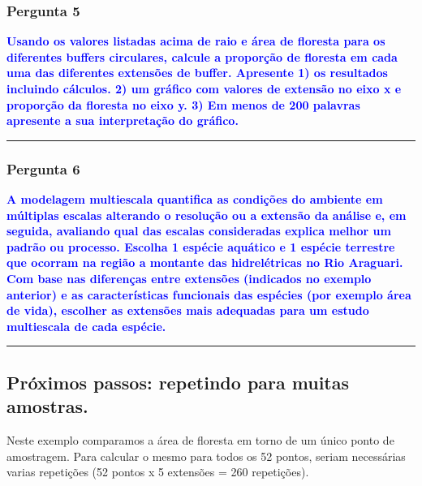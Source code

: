 \documentclass[
]{article}
\begin{document}
\hypertarget{pergunta-5}{%
\subsubsection{Pergunta 5}\label{pergunta-5}}

\textcolor{blue}{\textbf{Usando os valores listadas acima de raio e área de floresta para os diferentes buffers circulares, calcule a proporção de floresta em cada uma das diferentes extensões de buffer. Apresente 1) os resultados incluindo cálculos. 2) um gráfico com valores de extensão no eixo x e proporção da floresta no eixo y. 3) Em menos de 200 palavras apresente a sua interpretação do gráfico.}}

\begin{center}\rule{0.5\linewidth}{0.5pt}\end{center}

\hypertarget{pergunta-6}{%
\subsubsection{Pergunta 6}\label{pergunta-6}}

\textcolor{blue}{\textbf{A modelagem multiescala quantifica as condições do ambiente em múltiplas escalas alterando o resolução ou a extensão da análise e, em seguida, avaliando qual das escalas consideradas  explica melhor um padrão ou processo. Escolha 1 espécie aquático e 1 espécie terrestre que ocorram na região a montante das hidrelétricas no Rio Araguari. Com base nas diferenças entre extensões (indicados no exemplo anterior) e as características funcionais das espécies (por exemplo área de vida), escolher as extensões mais adequadas para um estudo multiescala de cada espécie.}}

\begin{center}\rule{0.5\linewidth}{0.5pt}\end{center}

\hypertarget{pruxf3ximos-passos-repetindo-para-muitas-amostras.}{%
\subsection{Próximos passos: repetindo para muitas amostras.}\label{pruxf3ximos-passos-repetindo-para-muitas-amostras.}}

Neste exemplo comparamos a área de floresta em torno de um único ponto de amostragem. Para calcular o mesmo para todos os 52 pontos, seriam necessárias varias repetições (52 pontos x 5 extensões = 260 repetições).
\end{document}
